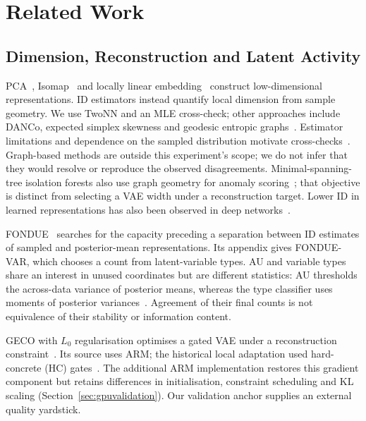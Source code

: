 \documentclass[make,article,submit,pdftex,moreauthors]{Definitions/mdpi}
\begin{document}
\section{Related Work}\label{sec:related}

\subsection{Dimension, Reconstruction and Latent Activity}
PCA~\cite{tippingbishop1999ppca}, Isomap~\cite{tenenbaum2000isomap} and
locally linear embedding~\cite{roweis2000lle} construct low-dimensional
representations. ID estimators instead quantify local dimension from
sample geometry. We use TwoNN and an MLE cross-check; other approaches
include DANCo, expected simplex skewness and geodesic entropic
graphs~\cite{ceruti2014danco,johnsson2015ess,costa2004geodesic}.
Estimator limitations and dependence on the sampled distribution motivate
cross-checks~\cite{camastra2016intrinsic,allegra2020data}.
Graph-based methods are outside this experiment's scope; we do not infer
that they would resolve or reproduce the observed disagreements.
Minimal-spanning-tree isolation forests also use graph geometry for
anomaly scoring~\cite{galka2022isolation}; that objective is distinct from
selecting a VAE width under a reconstruction target.
Lower ID in learned representations has also been observed in deep
networks~\cite{ansuini2019intrinsic,pope2021intrinsic}.

FONDUE~\cite{bonheme2022fondue} searches for the capacity preceding a
separation between ID estimates of sampled and posterior-mean
representations. Its appendix gives FONDUE-VAR, which chooses a count from
latent-variable types. AU and variable types share an interest in unused
coordinates but are different statistics: AU thresholds the across-data
variance of posterior means, whereas the type classifier uses moments of
posterior variances~\cite{bonheme2023active}. Agreement of their final
counts is not equivalence of their stability or information content.

GECO with $L_0$ regularisation optimises a gated VAE under a reconstruction
constraint~\cite{deboom2020geco,rezende2018geco}. Its source uses ARM;
the historical local adaptation used hard-concrete (HC)
gates~\cite{louizos2018l0}. The additional ARM implementation restores
this gradient component but retains differences in initialisation,
constraint scheduling and KL scaling (Section~\ref{sec:gpuvalidation}).
Our validation anchor supplies an external quality yardstick.
\end{document}
